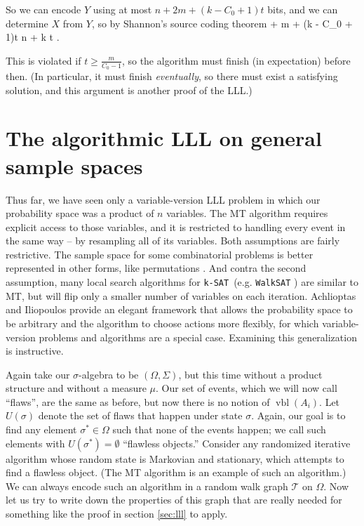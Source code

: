 \documentclass[twocolumn]{article}
\newcommand{\ksat}{\texttt{k-SAT}~}
\def\seqn#1\eeqn{\begin{align}#1\end{align}}
\begin{document}
So we can encode $Y$ using at most $n + 2m + (k - C_0 + 1)t$ bits, and we can determine $X$ from $Y$, so by Shannon's source coding theorem
\seqn
  n + m + (k - C_0 + 1)t \leq n + k t .
\eeqn

This is violated if $t \geq \frac{m}{C_0 - 1}$, so the algorithm must finish (in expectation) before then.  (In particular, it must finish \emph{eventually}, so there must exist a satisfying solution, and this argument is another proof of the LLL.)

\section{The algorithmic LLL on general sample spaces}
\label{sec:perfect}
Thus far, we have seen only a variable-version LLL problem in which our probability space was a product of $n$ variables.  The MT algorithm requires explicit access to those variables, and it is restricted to handling every event in the same way -- by resampling all of its variables.  Both assumptions are fairly restrictive.  The sample space for some combinatorial problems is better represented in other forms, like permutations \cite{achlioptas2014random}.  And contra the second assumption, many local search algorithms for \ksat (e.g. \texttt{WalkSAT} \cite{papadimitriou1991selecting}) are similar to MT, but will flip only a smaller number of variables on each iteration.  Achlioptas and Iliopoulos \cite{achlioptas2014random} provide an elegant framework that allows the probability space to be arbitrary and the algorithm to choose actions more flexibly, for which variable-version problems and algorithms are a special case.  Examining this generalization is instructive.

Again take our $\sigma$-algebra to be $(\Omega, \Sigma)$, but this time without a product structure and without a measure $\mu$.  Our set of events, which we will now call ``flaws'', are the same as before, but now there is no notion of $\operatorname{vbl}(A_i)$.  Let $U(\sigma)$ denote the set of flaws that happen under state $\sigma$.  Again, our goal is to find any element $\sigma^* \in \Omega$ such that none of the events happen; we call such elements with $U(\sigma^*) = \emptyset$ ``flawless objects.''  Consider any randomized iterative algorithm whose random state is Markovian and stationary, which attempts to find a flawless object.  (The MT algorithm is an example of such an algorithm.)  We can always encode such an algorithm in a random walk graph $\mathcal{T}$ on $\Omega$.  Now let us try to write down the properties of this graph that are really needed for something like the proof in section \ref{sec:lll} to apply.
\end{document}
